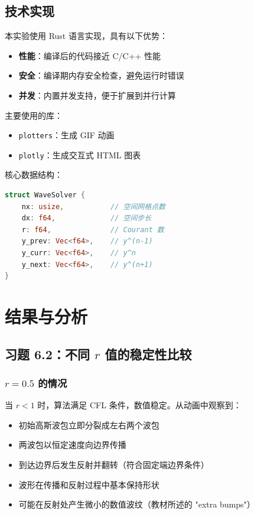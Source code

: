 \documentclass[12pt,a4paper]{article}
\begin{document}
\subsection{技术实现}

本实验使用 Rust 语言实现，具有以下优势：
\begin{itemize}
    \item \textbf{性能}：编译后的代码接近 C/C++ 性能
    \item \textbf{安全}：编译期内存安全检查，避免运行时错误
    \item \textbf{并发}：内置并发支持，便于扩展到并行计算
\end{itemize}

主要使用的库：
\begin{itemize}
    \item \texttt{plotters}：生成 GIF 动画
    \item \texttt{plotly}：生成交互式 HTML 图表
\end{itemize}

核心数据结构：
\begin{lstlisting}[language=Rust, caption=WaveSolver 结构体]
struct WaveSolver {
    nx: usize,           // 空间网格点数
    dx: f64,             // 空间步长
    r: f64,              // Courant 数
    y_prev: Vec<f64>,    // y^(n-1)
    y_curr: Vec<f64>,    // y^n
    y_next: Vec<f64>,    // y^(n+1)
}
\end{lstlisting}

\section{结果与分析}

\subsection{习题 6.2：不同 $r$ 值的稳定性比较}

\subsubsection{$r = 0.5$ 的情况}

当 $r < 1$ 时，算法满足 CFL 条件，数值稳定。从动画中观察到：
\begin{itemize}
    \item 初始高斯波包立即分裂成左右两个波包
    \item 两波包以恒定速度向边界传播
    \item 到达边界后发生反射并翻转（符合固定端边界条件）
    \item 波形在传播和反射过程中基本保持形状
    \item 可能在反射处产生微小的数值波纹（教材所述的 "extra bumps"）
\end{itemize}
\end{document}
